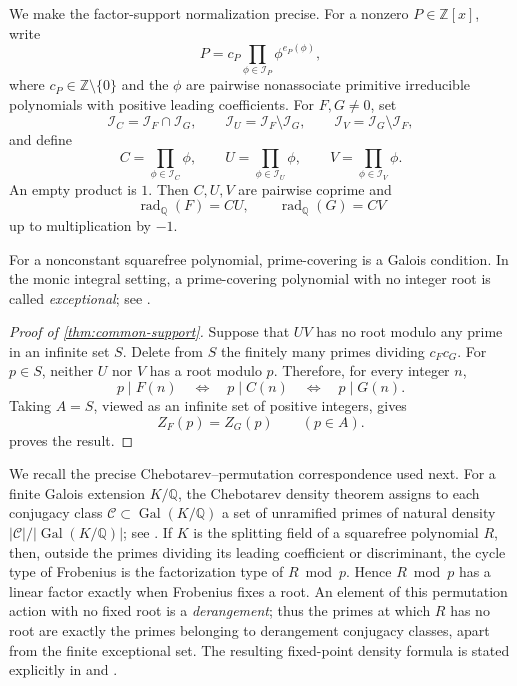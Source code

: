 \documentclass[11pt]{amsart}
\newcommand{\Z}{\mathbb Z}
\newcommand{\Q}{\mathbb Q}
\newcommand{\cI}{\mathcal I}
\newcommand{\radQ}{\operatorname{rad}_{\Q}}
\newcommand{\Gal}{\operatorname{Gal}}
\theoremstyle{definition}
\begin{document}
We make the factor-support normalization precise.  For a nonzero
\(P\in\Z[x]\), write
\[
  P=c_P\prod_{\phi\in\cI_P}\phi^{e_P(\phi)},
\]
where \(c_P\in\Z\setminus\{0\}\) and the \(\phi\) are pairwise
nonassociate primitive irreducible polynomials with positive leading
coefficients.  For \(F,G\ne0\), set
\[
  \cI_C=\cI_F\cap\cI_G,\qquad
  \cI_U=\cI_F\setminus\cI_G,\qquad
  \cI_V=\cI_G\setminus\cI_F,
\]
and define
\[
  C=\prod_{\phi\in\cI_C}\phi,\qquad
  U=\prod_{\phi\in\cI_U}\phi,\qquad
  V=\prod_{\phi\in\cI_V}\phi.
\]
An empty product is \(1\).  Then \(C,U,V\) are pairwise coprime and
\[
  \radQ(F)=CU,\qquad \radQ(G)=CV
\]
up to multiplication by \(-1\).

For a nonconstant squarefree polynomial, prime-covering is a Galois
condition.  In the monic integral setting, a prime-covering polynomial with
no integer root is called \emph{exceptional}; see
\cite{ElsholtzKlahnTechnau}.

\begin{proof}[Proof of \cref{thm:common-support}]
Suppose that \(UV\) has no root modulo any prime in an infinite set
\(S\).  Delete from \(S\) the finitely many primes dividing \(c_Fc_G\).
For \(p\in S\), neither \(U\) nor \(V\) has a root modulo \(p\).  Therefore,
for every integer \(n\),
\[
  p\mid F(n)
  \quad\Longleftrightarrow\quad
  p\mid C(n)
  \quad\Longleftrightarrow\quad
  p\mid G(n).
\]
Taking \(A=S\), viewed as an infinite set of positive integers, gives
\[
  Z_F(p)=Z_G(p)\qquad(p\in A).
\]
 proves the result.
\end{proof}

We recall the precise Chebotarev--permutation correspondence used next.  For a
finite Galois extension \(K/\Q\), the Chebotarev density theorem assigns to
each conjugacy class \(\mathcal C\subset\Gal(K/\Q)\) a set of unramified
primes of natural density \(|\mathcal C|/|\Gal(K/\Q)|\); see
\cite[Section~2, Chebotarev theorem]{ElsholtzKlahnTechnau}.  If \(K\) is the
splitting field of a squarefree polynomial \(R\), then, outside the primes
dividing its leading coefficient or discriminant, the cycle type of Frobenius
is the factorization type of \(R\bmod p\).  Hence \(R\bmod p\) has a linear
factor exactly when Frobenius fixes a root.  An element of this permutation
action with no fixed root is a \emph{derangement}; thus the primes at which
\(R\) has no root are exactly the primes belonging to derangement conjugacy
classes, apart from the finite exceptional set.  The resulting fixed-point
density formula is stated explicitly in
\cite[Theorem~2, p.~1666]{BerendBilu} and
\cite[Theorem~2.1]{ElsholtzKlahnTechnau}.
\end{document}
